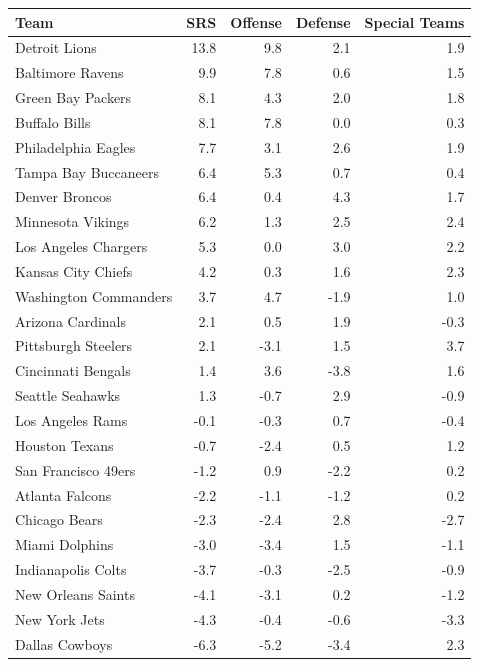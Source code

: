 \documentclass{report}
\begin{document}
\begin{table}[ht]
    \centering
    \begin{tabular}{ l | r r r r }
        \hline
        \hline
        Team & SRS & Offense & Defense & Special Teams\\
        \hline
        Detroit Lions & 13.8 & 9.8 & 2.1 & 1.9 \\
        Baltimore Ravens & 9.9 & 7.8 & 0.6 & 1.5 \\
        Green Bay Packers & 8.1 & 4.3 & 2.0 & 1.8 \\
        Buffalo Bills & 8.1 & 7.8 & 0.0 & 0.3 \\
        Philadelphia Eagles & 7.7 & 3.1 & 2.6 & 1.9 \\
        Tampa Bay Buccaneers & 6.4 & 5.3 & 0.7 & 0.4 \\
        Denver Broncos & 6.4 & 0.4 & 4.3 & 1.7 \\
        Minnesota Vikings & 6.2 & 1.3 & 2.5 & 2.4 \\
        Los Angeles Chargers & 5.3 & 0.0 & 3.0 & 2.2 \\
        Kansas City Chiefs & 4.2 & 0.3 & 1.6 & 2.3 \\
        Washington Commanders & 3.7 & 4.7 & -1.9 & 1.0 \\
        Arizona Cardinals & 2.1 & 0.5 & 1.9 & -0.3 \\
        Pittsburgh Steelers & 2.1 & -3.1 & 1.5 & 3.7 \\
        Cincinnati Bengals & 1.4 & 3.6 & -3.8 & 1.6 \\
        Seattle Seahawks & 1.3 & -0.7 & 2.9 & -0.9 \\
        Los Angeles Rams & -0.1 & -0.3 & 0.7 & -0.4 \\
        Houston Texans & -0.7 & -2.4 & 0.5 & 1.2 \\
        San Francisco 49ers & -1.2 & 0.9 & -2.2 & 0.2 \\
        Atlanta Falcons & -2.2 & -1.1 & -1.2 & 0.2 \\
        Chicago Bears & -2.3 & -2.4 & 2.8 & -2.7 \\
        Miami Dolphins & -3.0 & -3.4 & 1.5 & -1.1 \\
        Indianapolis Colts & -3.7 & -0.3 & -2.5 & -0.9 \\
        New Orleans Saints & -4.1 & -3.1 & 0.2 & -1.2 \\
        New York Jets & -4.3 & -0.4 & -0.6 & -3.3 \\
        Dallas Cowboys & -6.3 & -5.2 & -3.4 & 2.3 \\

\end{tabular}
\end{table}
\end{document}
